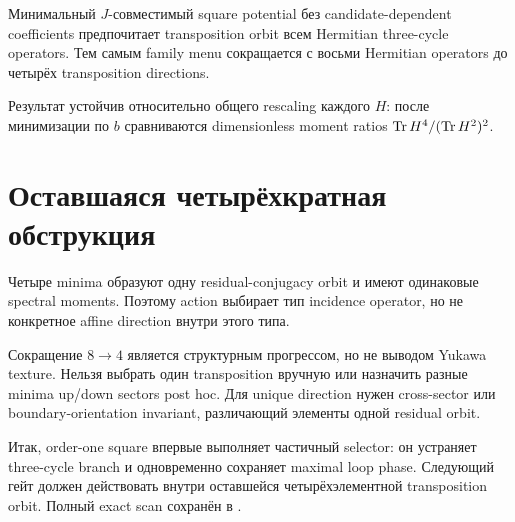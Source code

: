 \begin{theorem}
Минимальный \(J\)-совместимый square potential без candidate-dependent
coefficients предпочитает transposition orbit всем Hermitian three-cycle
operators. Тем самым family menu сокращается с восьми Hermitian operators
до четырёх transposition directions.
\end{theorem}

Результат устойчив относительно общего rescaling каждого \(H\): после
минимизации по \(b\) сравниваются dimensionless moment ratios
\(\operatorname{Tr} H^4/(\operatorname{Tr} H^2)^2\).

\section{Оставшаяся четырёхкратная обструкция}

Четыре minima образуют одну residual-conjugacy orbit и имеют одинаковые
spectral moments. Поэтому action выбирает тип incidence operator, но не
конкретное affine direction внутри этого типа.

\begin{nogocriterion}
Сокращение \(8\to4\) является структурным прогрессом, но не выводом Yukawa
texture. Нельзя выбрать один transposition вручную или назначить разные
minima up/down sectors post hoc. Для unique direction нужен cross-sector или
boundary-orientation invariant, различающий элементы одной residual orbit.
\end{nogocriterion}

Итак, order-one square впервые выполняет частичный selector: он устраняет
three-cycle branch и одновременно сохраняет maximal loop phase. Следующий
гейт должен действовать внутри оставшейся четырёхэлементной transposition
orbit. Полный exact scan сохранён в
.